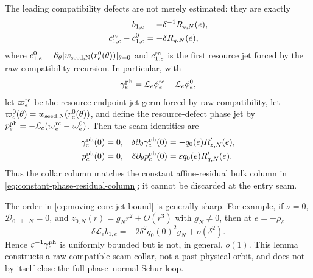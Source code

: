 \begin{lemma}
The leading compatibility defects are not merely estimated: they are
exactly
\begin{align}
 b_{1,e}&=-\delta^{-1}R_{z,N}(e),\notag\\
 c_{1,e}^{\rm rc}-c_{1,e}^{0}
 &=-\delta R_{q,N}(e),                            \label{eq:moving-core-first-defects}
\end{align}
where
\(c_{1,e}^{0}=\partial_\theta
  [w_{\rm seed,N}(r_e^0(\theta))]_{\theta=0}\)
and \(c_{1,e}^{\rm rc}\) is the first resource jet forced by the raw
compatibility recursion.  In particular, with
\begin{equation}
 \gamma_e^{\rm ph}
 =\mathcal L_e\phi_e^{\rm rc}-\mathcal L_e\phi_e^0,
                                                               \label{eq:moving-core-phase-collar}
\end{equation}
let \(\varpi_e^{\rm rc}\) be the resource endpoint jet germ forced by raw
compatibility, let
\(\varpi_e^0(\theta)=w_{\rm seed,N}(r_e^0(\theta))\), and define the
resource-defect phase jet by
\(
 p_e^{\rm ph}=-\mathcal L_e(\varpi_e^{\rm rc}-\varpi_e^0)
\).
Then the seam identities are
\begin{align}
 \gamma_e^{\rm ph}(0)&=0,
 &\delta\partial_\theta\gamma_e^{\rm ph}(0)
   &=-q_0(e)R_{z,N}'(e),\notag\\
 p_e^{\rm ph}(0)&=0,
 &\delta\partial_\theta p_e^{\rm ph}(0)
   &=\varepsilon q_0(e)R_{q,N}'(e).               \label{eq:moving-core-seam-match}
\end{align}
Thus the collar column matches the constant affine-residual bulk column in
\cref{eq:constant-phase-residual-column}; it cannot be discarded at the
entry seam.

The order in \cref{eq:moving-core-jet-bound} is generally sharp.  For
example, if \(\nu=0\), \(\mathcal D_{0,\perp,N}=0\), and
\(z_{0,N}(r)=g_Nr^2+O(r^3)\) with \(g_N\ne0\), then at
\(e=-\rho_\delta\)
\begin{equation}
 \delta\mathcal L_eb_{1,e}
 =-2\delta^2q_0(0)^2g_N+o(\delta^2).              \label{eq:moving-core-sharpness}
\end{equation}
Hence \(\varepsilon^{-1}\gamma_e^{\rm ph}\) is uniformly bounded but is
not, in general, \(o(1)\).  This lemma constructs a raw-compatible seam
collar, not a past physical orbit, and does not by itself close the full
phase--normal Schur loop.
\end{lemma}

